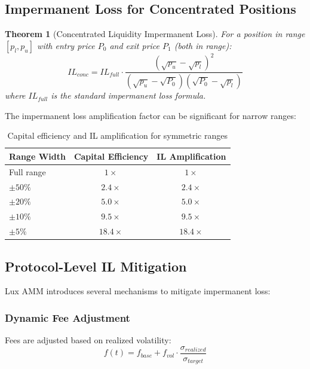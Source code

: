 \documentclass[11pt,a4paper]{article}
\newtheorem{theorem}{Theorem}
\begin{document}
\subsection{Impermanent Loss for Concentrated Positions}

\begin{theorem}[Concentrated Liquidity Impermanent Loss]
For a position in range $[p_l, p_u]$ with entry price $P_0$ and exit price $P_1$ (both in range):
\begin{equation}
    IL_{conc} = IL_{full} \cdot \frac{(\sqrt{p_u} - \sqrt{p_l})^2}{(\sqrt{p_u} - \sqrt{P_0})(\sqrt{P_0} - \sqrt{p_l})}
\end{equation}
where $IL_{full}$ is the standard impermanent loss formula.
\end{theorem}

The impermanent loss amplification factor can be significant for narrow ranges:

\begin{table}[h]
\centering
\begin{tabular}{@{}lcc@{}}
\toprule
Range Width & Capital Efficiency & IL Amplification \\
\midrule
Full range & $1\times$ & $1\times$ \\
$\pm 50\%$ & $2.4\times$ & $2.4\times$ \\
$\pm 20\%$ & $5.0\times$ & $5.0\times$ \\
$\pm 10\%$ & $9.5\times$ & $9.5\times$ \\
$\pm 5\%$ & $18.4\times$ & $18.4\times$ \\
\bottomrule
\end{tabular}
\caption{Capital efficiency and IL amplification for symmetric ranges}
\label{tab:efficiency}
\end{table}

\subsection{Protocol-Level IL Mitigation}

Lux AMM introduces several mechanisms to mitigate impermanent loss:

\subsubsection{Dynamic Fee Adjustment}

Fees are adjusted based on realized volatility:
\begin{equation}
    f(t) = f_{base} + f_{vol} \cdot \frac{\sigma_{realized}}{\sigma_{target}}
\end{equation}
\end{document}
